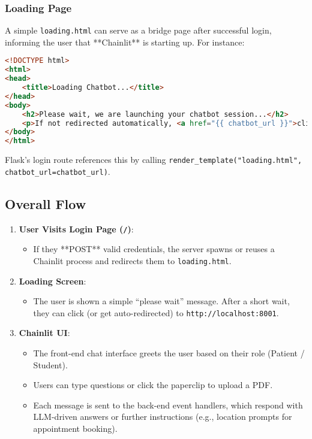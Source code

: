 \subsubsection{Loading Page}

A simple \texttt{loading.html} can serve as a bridge page after successful login, informing the user that **Chainlit** is starting up. For instance:

\begin{lstlisting}[language=HTML, caption={loading.html (Flask Template)}, basicstyle=\small\ttfamily]
<!DOCTYPE html>
<html>
<head>
    <title>Loading Chatbot...</title>
</head>
<body>
    <h2>Please wait, we are launching your chatbot session...</h2>
    <p>If not redirected automatically, <a href="{{ chatbot_url }}">click here</a>.</p>
</body>
</html>
\end{lstlisting}

\noindent
Flask’s login route references this by calling \texttt{render\_template("loading.html", chatbot\_url=chatbot\_url)}.

\subsection{Overall Flow}

\begin{enumerate}
    \item \textbf{User Visits Login Page (\texttt{/})}:
    \begin{itemize}
        \item If they **POST** valid credentials, the server spawns or reuses a Chainlit process and redirects them to \texttt{loading.html}.
    \end{itemize}
    \item \textbf{Loading Screen}:
    \begin{itemize}
        \item The user is shown a simple “please wait” message. After a short wait, they can click (or get auto-redirected) to \texttt{http://localhost:8001}.
    \end{itemize}
    \item \textbf{Chainlit UI}:
    \begin{itemize}
        \item The front-end chat interface greets the user based on their role (Patient / Student).
        \item Users can type questions or click the paperclip to upload a PDF. 
        \item Each message is sent to the back-end event handlers, which respond with LLM-driven answers or further instructions (e.g., location prompts for appointment booking).
    \end{itemize}
\end{enumerate}

